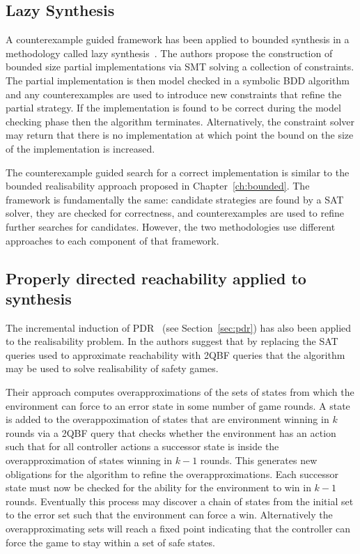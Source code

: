 \subsection{Lazy Synthesis}

A counterexample guided framework has been applied to bounded synthesis in a methodology called lazy synthesis~\cite{Finkbeiner12}. The authors propose the construction of bounded size partial implementations via SMT solving a collection of constraints. The partial implementation is then model checked in a symbolic BDD algorithm and any counterexamples are used to introduce new constraints that refine the partial strategy. If the implementation is found to be correct during the model checking phase then the algorithm terminates. Alternatively, the constraint solver may return that there is no implementation at which point the bound on the size of the implementation is increased. 

The counterexample guided search for a correct implementation is similar to the bounded realisability approach proposed in Chapter~\ref{ch:bounded}. The framework is fundamentally the same: candidate strategies are found by a SAT solver, they are checked for correctness, and counterexamples are used to refine further searches for candidates. However, the two methodologies use different approaches to each component of that framework.

\subsection{Properly directed reachability applied to synthesis}

The incremental induction of PDR~\cite{Bradley11} (see Section~\ref{sec:pdr}) has also been applied to the realisability problem. In \cite{Morgenstern13} the authors suggest that by replacing the SAT queries used to approximate reachability with 2QBF queries that the algorithm may be used to solve realisability of safety games. 

Their approach computes overapproximations of the sets of states from which the environment can force to an error state in some number of game rounds. A state is added to the overappoximation of states that are environment winning in $k$ rounds via a 2QBF query that checks whether the environment has an action such that for all controller actions a successor state is inside the overapproximation of states winning in $k-1$ rounds. This generates new obligations for the algorithm to refine the overapproximations. Each successor state must now be checked for the ability for the environment to win in $k-1$ rounds. Eventually this process may discover a chain of states from the initial set to the error set such that the environment can force a win. Alternatively the overapproximating sets will reach a fixed point indicating that the controller can force the game to stay within a set of safe states.

